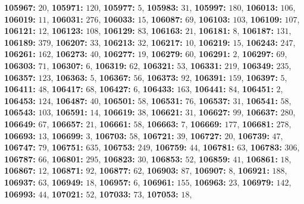 \textsf{\bfseries 105967:} $20$, \textsf{\bfseries 105971:} $120$, \textsf{\bfseries 105977:} $5$, \textsf{\bfseries 105983:} $31$, \textsf{\bfseries 105997:} $180$, \textsf{\bfseries 106013:} $106$, \textsf{\bfseries 106019:} $11$, \textsf{\bfseries 106031:} $276$, \textsf{\bfseries 106033:} $15$, \textsf{\bfseries 106087:} $69$, \textsf{\bfseries 106103:} $103$, \textsf{\bfseries 106109:} $107$, \textsf{\bfseries 106121:} $12$, \textsf{\bfseries 106123:} $108$, \textsf{\bfseries 106129:} $83$, \textsf{\bfseries 106163:} $21$, \textsf{\bfseries 106181:} $8$, \textsf{\bfseries 106187:} $131$, \textsf{\bfseries 106189:} $379$, \textsf{\bfseries 106207:} $33$, \textsf{\bfseries 106213:} $32$, \textsf{\bfseries 106217:} $10$, \textsf{\bfseries 106219:} $15$, \textsf{\bfseries 106243:} $247$, \textsf{\bfseries 106261:} $162$, \textsf{\bfseries 106273:} $40$, \textsf{\bfseries 106277:} $19$, \textsf{\bfseries 106279:} $60$, \textsf{\bfseries 106291:} $2$, \textsf{\bfseries 106297:} $69$, \textsf{\bfseries 106303:} $71$, \textsf{\bfseries 106307:} $6$, \textsf{\bfseries 106319:} $62$, \textsf{\bfseries 106321:} $53$, \textsf{\bfseries 106331:} $219$, \textsf{\bfseries 106349:} $235$, \textsf{\bfseries 106357:} $123$, \textsf{\bfseries 106363:} $5$, \textsf{\bfseries 106367:} $56$, \textsf{\bfseries 106373:} $92$, \textsf{\bfseries 106391:} $159$, \textsf{\bfseries 106397:} $5$, \textsf{\bfseries 106411:} $48$, \textsf{\bfseries 106417:} $68$, \textsf{\bfseries 106427:} $6$, \textsf{\bfseries 106433:} $163$, \textsf{\bfseries 106441:} $84$, \textsf{\bfseries 106451:} $2$, \textsf{\bfseries 106453:} $124$, \textsf{\bfseries 106487:} $40$, \textsf{\bfseries 106501:} $58$, \textsf{\bfseries 106531:} $76$, \textsf{\bfseries 106537:} $31$, \textsf{\bfseries 106541:} $58$, \textsf{\bfseries 106543:} $103$, \textsf{\bfseries 106591:} $14$, \textsf{\bfseries 106619:} $38$, \textsf{\bfseries 106621:} $31$, \textsf{\bfseries 106627:} $99$, \textsf{\bfseries 106637:} $280$, \textsf{\bfseries 106649:} $67$, \textsf{\bfseries 106657:} $21$, \textsf{\bfseries 106661:} $58$, \textsf{\bfseries 106663:} $7$, \textsf{\bfseries 106669:} $177$, \textsf{\bfseries 106681:} $278$, \textsf{\bfseries 106693:} $13$, \textsf{\bfseries 106699:} $3$, \textsf{\bfseries 106703:} $58$, \textsf{\bfseries 106721:} $39$, \textsf{\bfseries 106727:} $20$, \textsf{\bfseries 106739:} $47$, \textsf{\bfseries 106747:} $79$, \textsf{\bfseries 106751:} $635$, \textsf{\bfseries 106753:} $249$, \textsf{\bfseries 106759:} $44$, \textsf{\bfseries 106781:} $63$, \textsf{\bfseries 106783:} $306$, \textsf{\bfseries 106787:} $66$, \textsf{\bfseries 106801:} $295$, \textsf{\bfseries 106823:} $30$, \textsf{\bfseries 106853:} $52$, \textsf{\bfseries 106859:} $41$, \textsf{\bfseries 106861:} $18$, \textsf{\bfseries 106867:} $12$, \textsf{\bfseries 106871:} $92$, \textsf{\bfseries 106877:} $62$, \textsf{\bfseries 106903:} $87$, \textsf{\bfseries 106907:} $8$, \textsf{\bfseries 106921:} $188$, \textsf{\bfseries 106937:} $63$, \textsf{\bfseries 106949:} $18$, \textsf{\bfseries 106957:} $6$, \textsf{\bfseries 106961:} $155$, \textsf{\bfseries 106963:} $23$, \textsf{\bfseries 106979:} $142$, \textsf{\bfseries 106993:} $44$, \textsf{\bfseries 107021:} $52$, \textsf{\bfseries 107033:} $73$, \textsf{\bfseries 107053:} $18$, 
